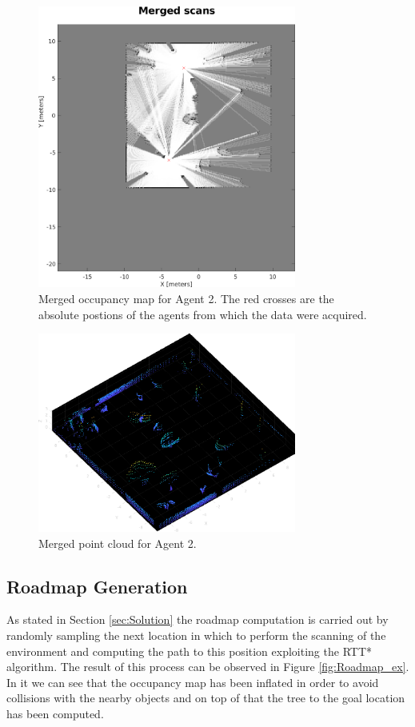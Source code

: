 \documentclass[twocolumn, a4paper]{article}
\begin{document}
\begin{figure}[h!]
    \centering
    \includegraphics[width=8.5cm]{"../Report_images/Merged_occupancies.png"}
    \caption{Merged occupancy map for Agent 2. The red crosses are the
             absolute postions of the agents from which the data were
             acquired.}
    \label{fig:occ_merged}
\end{figure}
\begin{figure}[h!]
    \centering
    \includegraphics[width=8.5cm]{"../Report_images/Merged_cloud.png"}
    \caption{Merged point cloud for Agent 2.}
    \label{fig:cloud_merged}
\end{figure}

\subsection{Roadmap Generation}
As stated in Section \ref{sec:Solution} the roadmap computation is
carried out by randomly sampling the next location in which to perform the
scanning of the environment and computing the path to this position exploiting
the RTT* algorithm. The result of this process can be observed in Figure
\ref{fig:Roadmap_ex}. In it we can see that the occupancy map has been
inflated in order to avoid collisions with the nearby objects and on top
of that the tree to the goal location has been computed.
\end{document}
